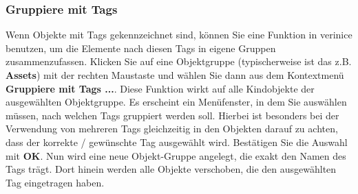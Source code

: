 \documentclass[a4paper,10pt]{book}
\begin{document}
\subsubsection{Gruppiere mit Tags} \label{Gruppiere mit Tags}
Wenn Objekte mit Tags gekennzeichnet sind, können Sie eine Funktion in verinice benutzen,
um die Elemente nach diesen Tags in eigene Gruppen zusammenzufassen.
Klicken Sie auf eine Objektgruppe (typischerweise ist das z.B. \textbf{Assets})
mit der rechten Maustaste und wählen Sie dann aus dem Kontextmenü \textbf{Gruppiere mit Tags ...}.
Diese Funktion wirkt auf alle Kindobjekte der ausgewählten Objektgruppe.
Es erscheint ein Menüfenster, in dem Sie auswählen müssen, nach welchen Tags gruppiert werden soll.
Hierbei ist besonders bei der Verwendung von mehreren Tags gleichzeitig in den Objekten
darauf zu achten, dass der korrekte / gewünschte Tag ausgewählt wird. Bestätigen Sie die Auswahl mit
\textbf{OK}. Nun wird eine neue Objekt-Gruppe angelegt, die exakt den Namen des Tags trägt.
Dort hinein werden alle Objekte verschoben, die den ausgewählten Tag eingetragen haben.
\end{document}
